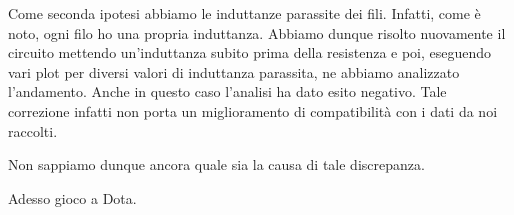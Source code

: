 Come seconda ipotesi abbiamo le induttanze parassite dei fili. Infatti, come è noto, ogni filo ho una propria induttanza. Abbiamo dunque risolto nuovamente il circuito mettendo un'induttanza subito prima della resistenza e poi, eseguendo vari plot per diversi valori di induttanza parassita, ne abbiamo analizzato l'andamento. Anche in questo caso l'analisi ha dato esito negativo. Tale correzione infatti non porta un miglioramento di compatibilità con i dati da noi raccolti. 

Non sappiamo dunque ancora quale sia la causa di tale discrepanza.

Adesso gioco a Dota.